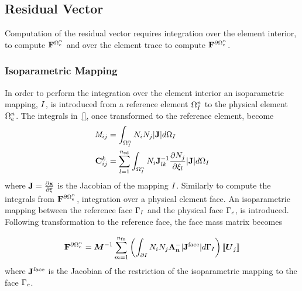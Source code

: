 \subsection{Residual Vector}
Computation of the residual vector requires integration over the element
interior, to compute $\mathbf{F}^{\Omega_e^{n}}$ and over the element trace to compute $\mathbf{F}^{\partial \Omega_e^{n}}$.

\subsubsection{Isoparametric Mapping}
In order to perform the integration over the element interior an isoparametric
mapping, $I$, is introduced from a reference element $\Omega^{n}_{I}$ to the
physical element $\Omega_e^{n}$. The integrals in~\eqref{}, once transformed to the
reference element, become
\begin{align*}
\mathit{M}_{ij} &= \int_{\Omega^{n}_{I}} N_i N_j |\mathbf{J}| d\Omega_{I} \\
\mathbf{C}^{k}_{ij} &= 
                               \sum_{l=1}^{n_\textrm{sd}}
                                \int_{\Omega^{n}_{I}} N_i
                               \mathbf{J}_{lk}^{-1}
                               \frac{\partial N_j}{\partial \xi_{l}}
                             |\mathbf{J}|
                             d\Omega_{I}
\end{align*}
where $\mathbf{J} = \frac{\partial \mathbf{x}}{\partial \mathbf{\xi}}$ is the Jacobian of the mapping $I$. Similarly to compute the integrals from $\mathbf{F}^{\partial \Omega_e^{n}}$, integration over a physical element face. An isoparametric mapping between the reference face $\Gamma_{I}$ and the physical face $\Gamma_e$, is introduced. Following transformation to the reference face, the face mass matrix becomes

$$
 \mathbf{F}^{\partial \Omega_e^{n}} = \boldsymbol{M}^{-1}
 \sum_{m=1}^{n_\textrm{fn}}
 \left( 
 \int_{\partial I}
N_i N_j \mathbf{A}_\mathbf{n}^{-} |\mathbf{J}^{\textrm{face}}| d\Gamma_{I}
 \right)
\llbracket \boldsymbol{U}_j \rrbracket
$$
where $\mathbf{J}^{\textrm{face}}$ is the Jacobian of the restriction of the isoparametric
mapping to the face $\Gamma_e$.

